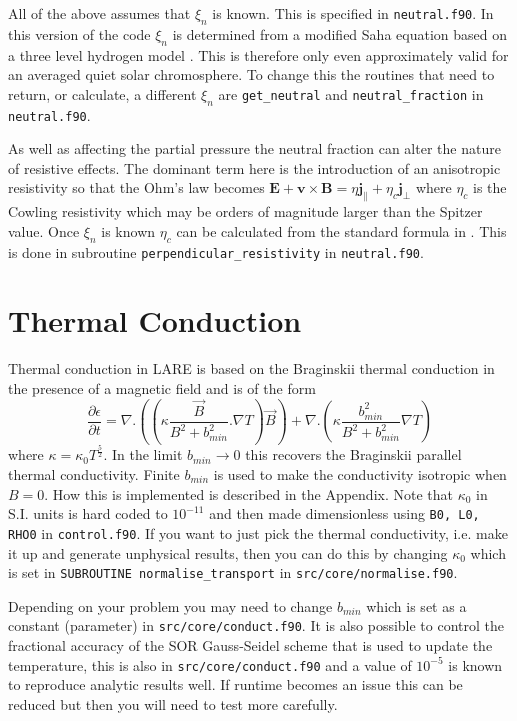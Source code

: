 \documentclass[11pt]{article}
\begin{document}
All of the above assumes that $\xi_n$ is known. This is specified in \texttt{neutral.f90}. In this version of the code $\xi_n$ is determined from a modified Saha equation based on a three level hydrogen model \cite{brown}. This is therefore only even approximately valid for an averaged quiet solar chromosphere. To change this the routines that need to return, or calculate, a different $\xi_n$ are \texttt{get\_neutral} and \texttt{neutral\_fraction} in \texttt{neutral.f90}. 

As well as affecting the partial pressure the neutral fraction can alter the nature of resistive effects. The dominant term here is the introduction of an anisotropic resistivity so that the Ohm's law becomes
$\mathbf{E}+\mathbf{v}\times\mathbf{B}=\eta \mathbf{j_{\parallel}} + \eta_c \mathbf{j_{\perp}}$
where $\eta_c$ is the Cowling resistivity which may be orders of magnitude larger than the Spitzer value. Once $\xi_n$ is known $\eta_c$ can be calculated from the standard formula in \cite{flux-emergence}. This is done in subroutine \texttt{perpendicular\_resistivity} in \texttt{neutral.f90}.

\section{Thermal Conduction} %
\label{sec:thermal_conduction}
Thermal conduction in LARE is based on the Braginskii thermal conduction in the presence of a magnetic field and is of the form\\
\[
\frac{\partial \epsilon}{\partial t} = \nabla . \left(\left(\kappa \frac{\vec{B}}{B^2+b_{min}^2}. \nabla T\right) \vec{B} \right) +  \nabla . \left(\kappa  \frac{b_{min}^2}{B^2+b_{min}^2}  \nabla T \right)
\]
where $\kappa = \kappa_0  T^\frac{5}{2}$. In the limit $b_{min}\to 0$ this recovers the Braginskii parallel thermal conductivity. Finite $b_{min}$ is used to make the conductivity isotropic when $B=0$.  How this is implemented is described in the Appendix. Note that $\kappa_0$ in S.I. units is hard coded to $10^{-11}$ and then made dimensionless using 
{\tt B0, L0, RHO0} in {\tt control.f90}. If you want to just pick the thermal conductivity, i.e. make it up and generate unphysical results, then you can do this by changing $\kappa_0$ which is set in {\tt SUBROUTINE normalise\_transport} in {\tt src/core/normalise.f90}.

Depending on your problem you may need to change $b_{min}$ which is set as a constant (parameter) in {\tt src/core/conduct.f90}. It is also possible to control the fractional accuracy of the SOR Gauss-Seidel scheme that is used to update the temperature, this is also in {\tt src/core/conduct.f90} and a value of $10^{-5}$ is known to reproduce analytic results well. If runtime becomes an issue this can be reduced but then you will need to test more carefully.
\end{document}

